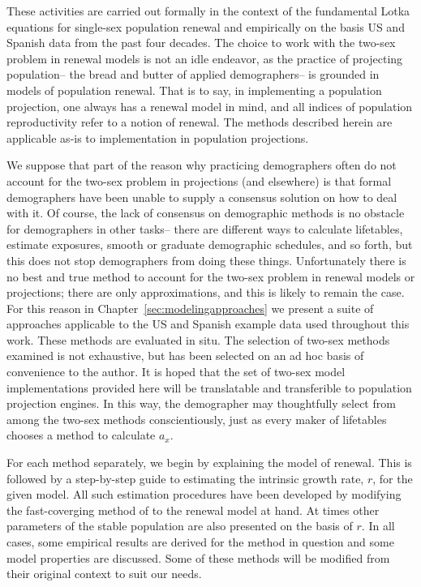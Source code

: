 These activities are carried out formally in the context of the fundamental
Lotka equations for single-sex population renewal and empirically on the basis 
US and Spanish data from the past four decades. The choice to work with the two-sex problem in
renewal models is not an idle endeavor, as the practice of projecting
population-- the bread and butter of applied demographers-- is grounded in
models of population renewal. That is to say, in implementing a population 
projection, one always has a renewal model in mind, and all indices of
population reproductivity refer to a notion of renewal. The methods
described herein are applicable as-is to implementation in population
projections.

We suppose that part of the reason why practicing
demographers often do not account for the two-sex problem in projections (and 
elsewhere) is that formal demographers have been unable to supply a
consensus solution on how to deal with it. Of course, the lack of consensus on
demographic methods is no obstacle for demographers in other tasks-- there are 
different ways to calculate lifetables, estimate exposures, smooth or graduate
demographic schedules, and so forth, but this does not stop demographers from
doing these things. Unfortunately there is no
best and true method to account for the two-sex problem in renewal models or projections; 
there are only approximations, and this is likely to remain the case. For this
reason in Chapter~\ref{sec:modelingapproaches} we present a suite of 
approaches applicable to the US and Spanish example data 
used throughout this work. These methods are evaluated in situ. The selection of
two-sex methods examined is not exhaustive, but has been selected on
an ad hoc basis of convenience to the author. It is hoped that the set of
two-sex model implementations provided here will be translatable and
transferible to population projection engines. In this way, the demographer may
thoughtfully select from among the two-sex methods conscientiously, just as
every maker of lifetables chooses a method to calculate $a_x$.

For each method separately, we begin by explaining the model of renewal. This
is followed by a step-by-step guide to estimating the intrinsic growth rate,
$r$, for the given model. All such estimation procedures have been developed by
modifying the fast-coverging method of \citet{coale1957new} to the renewal model
at hand. At times other parameters of the stable population are also presented
on the basis of $r$. In all cases, some empirical results are derived for the
method in question and some model properties are discussed. Some of these
methods will be modified from their original context to suit our needs.

